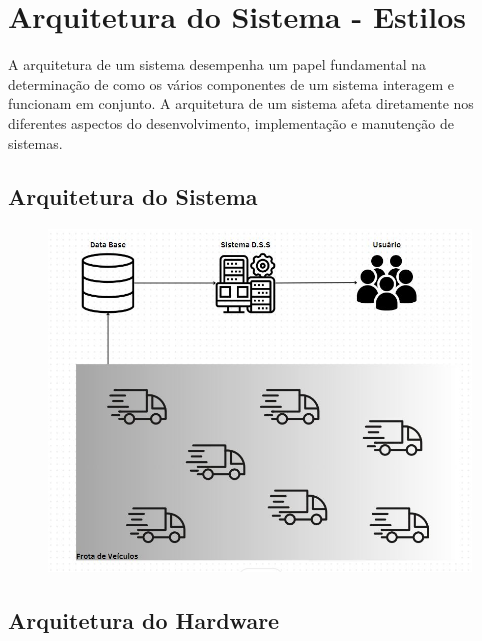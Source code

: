 \section{Arquitetura do Sistema - Estilos}

    
    A arquitetura de um sistema desempenha um papel fundamental na determinação de como os vários componentes de um sistema interagem e funcionam em conjunto. A arquitetura de um sistema afeta diretamente nos diferentes aspectos do desenvolvimento, implementação e manutenção de sistemas. 

    \subsection{Arquitetura do Sistema}

	\begin{figure}[H]
		\centering
		\includegraphics[width=1.2\linewidth]{Pictures/Arq0}
		\caption{}
		\label{fig:arq0}
	\end{figure}

    \subsection{Arquitetura do Hardware}

